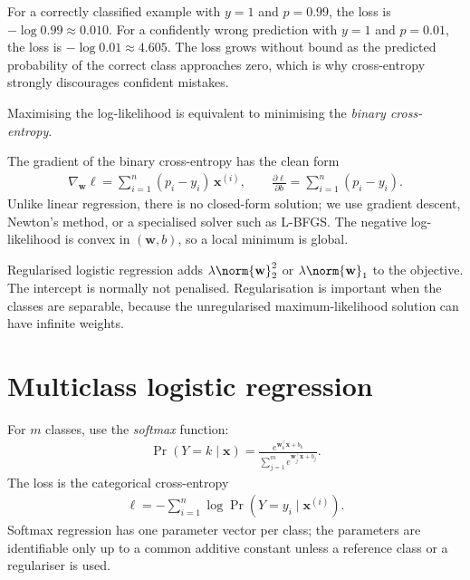 \documentclass[a4paper, 12pt]{book}
\begin{document}
\begin{example}
    For a correctly classified example with $y=1$ and $p=0.99$, the loss is
    $-\log 0.99 \approx 0.010$. For a confidently wrong prediction with $y=1$
    and $p=0.01$, the loss is $-\log 0.01 \approx 4.605$. The loss grows without
    bound as the predicted probability of the correct class approaches zero,
    which is why cross-entropy strongly discourages confident mistakes.
\end{example}

Maximising the log-likelihood is equivalent to minimising the \emph{binary cross-entropy}.

The gradient of the binary cross-entropy has the clean form
\begin{align}
    \nabla_{\mathbf{w}} \ell
    = \sum_{i=1}^n (p_i - y_i)\,\mathbf{x}^{(i)},
    \qquad
    \frac{\partial \ell}{\partial b}
    = \sum_{i=1}^n (p_i - y_i).
\end{align}
Unlike linear regression, there is no closed-form solution; we use gradient descent,
Newton's method, or a specialised solver such as L-BFGS. The negative log-likelihood
is convex in $(\mathbf{w},b)$, so a local minimum is global.

Regularised logistic regression adds $\lambda\norm{\mathbf{w}}_2^2$ or
$\lambda\norm{\mathbf{w}}_1$ to the objective. The intercept is normally not
penalised. Regularisation is important when the classes are separable, because the
unregularised maximum-likelihood solution can have infinite weights.

\section{Multiclass logistic regression}

For $m$ classes, use the \emph{softmax} function:
\begin{align}
    \Pr(Y=k\mid\mathbf{x})
    = \frac{e^{\mathbf{w}_k^\top\mathbf{x}+b_k}}
           {\sum_{j=1}^m e^{\mathbf{w}_j^\top\mathbf{x}+b_j}}.
\end{align}
The loss is the categorical cross-entropy
\begin{align}
    \ell = -\sum_{i=1}^n \log \Pr(Y=y_i\mid\mathbf{x}^{(i)}).
\end{align}
Softmax regression has one parameter vector per class; the parameters are
identifiable only up to a common additive constant unless a reference class or a
regulariser is used.
\end{document}
